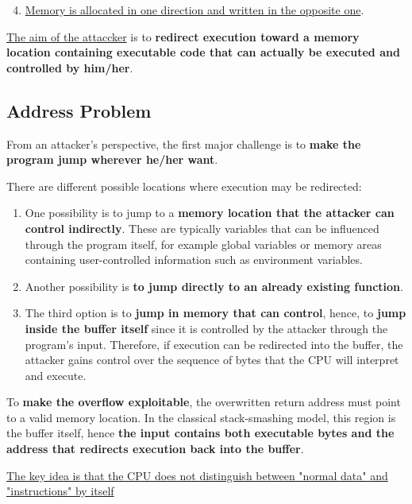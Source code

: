 \documentclass{article}
\begin{document}
\begin{enumerate}
\setcounter{enumi}{3}
\item \underline{Memory is allocated in one direction and written in the opposite one}.
\end{enumerate}

\underline{The aim of the attaccker} is to \textbf{redirect execution toward a memory location containing executable code that can actually be executed and controlled by him/her}.

\subsection{Address Problem}

From an attacker's perspective, the first major challenge is to \textbf{make the program jump wherever he/her want}.

There are different possible locations where execution may be redirected:

\begin{enumerate}
\item One possibility is to jump to a \textbf{memory location that the attacker can control indirectly}. These are typically variables that can be influenced through the program itself, for example global variables or memory areas containing user-controlled information such as environment variables.

\item Another possibility is \textbf{to jump directly to an already existing function}.

\item The third option is to \textbf{jump in memory that can control}, hence, to \textbf{jump inside the buffer itself} since it is controlled by the attacker through the program's input. Therefore, if execution can be redirected into the buffer, the attacker gains control over the sequence of bytes that the CPU will interpret and execute.
\end{enumerate}

To \textbf{make the overflow exploitable}, the overwritten return address must point to a valid memory location. In the classical stack-smashing model, this region is the buffer itself, hence \textbf{the input contains both executable bytes and the address that redirects execution back into the buffer}.

\underline{The key idea is that the CPU does not distinguish between "normal data" and "instructions" by itself}
\end{document}
